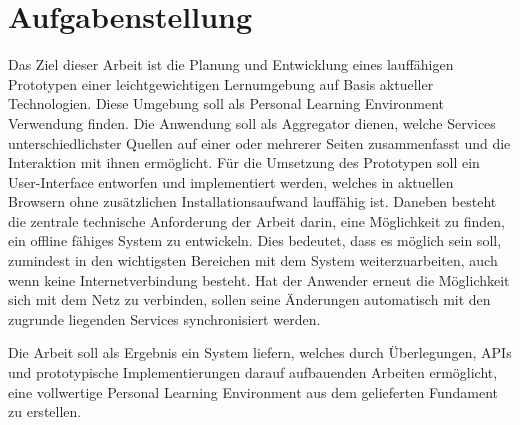 \section{Aufgabenstellung}
Das Ziel dieser Arbeit ist die Planung und Entwicklung eines lauffähigen Prototypen einer leichtgewichtigen Lernumgebung auf Basis aktueller Technologien. Diese Umgebung soll als Personal Learning Environment Verwendung finden. Die Anwendung soll als Aggregator dienen, welche Services unterschiedlichster Quellen auf einer oder mehrerer Seiten zusammenfasst und die Interaktion mit ihnen ermöglicht. Für die Umsetzung des Prototypen soll ein User-Interface entworfen und implementiert werden, welches in aktuellen Browsern ohne zusätzlichen Installationsaufwand lauffähig ist. Daneben besteht die zentrale technische Anforderung der Arbeit darin, eine Möglichkeit zu finden, ein offline fähiges System zu entwickeln. Dies bedeutet, dass es möglich sein soll, zumindest in den wichtigsten Bereichen mit dem System weiterzuarbeiten, auch wenn keine Internetverbindung besteht. Hat der Anwender erneut die Möglichkeit sich mit dem Netz zu verbinden, sollen seine Änderungen automatisch mit den zugrunde liegenden Services synchronisiert werden.

Die Arbeit soll als Ergebnis ein System liefern, welches durch Überlegungen, APIs und prototypische Implementierungen darauf aufbauenden Arbeiten ermöglicht, eine vollwertige Personal Learning Environment aus dem gelieferten Fundament zu erstellen.

